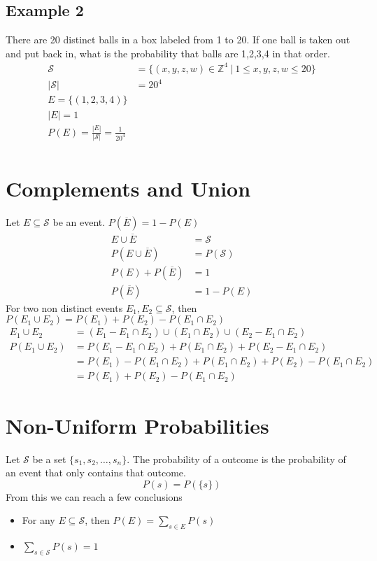 \documentclass{article}
\theoremstyle{mytheoremstyle}
\theoremstyle{mytheoremstyle}
\theoremstyle{myproblemstyle}
\begin{document}
    \subsection*{Example 2}
    There are 20 distinct balls in a box labeled from 1 to 20. If one ball is
    taken out and put back in, what is the probability that balls are 1,2,3,4 in
    that order.
    \begin{align*}
        \mathcal{S} &= \{ (x,y,z,w)\in \mathbb{Z}^4\ |\ 1\le x,y,z,w\le 20\} \\
        |\mathcal{S}| &= 20^4 \\
        E = \{(1,2,3,4)\} \\
        |E| = 1 \\
        P(E) = \frac{|E|}{|\mathcal{S}|} = \frac{1}{20^4} \\
    \end{align*}

    \section*{Complements and Union}
    Let $E\subseteq \mathcal{S}$ be an event. $P(\overline{E})=1-P(E)$
    \begin{align*}
        E \cup \overline{E} &= \mathcal{S} \\
        P(E \cup \overline{E}) &= P(\mathcal{S}) \\
        P(E) + P(\overline{E}) &= 1 \\
        P(\overline{E}) &= 1 - P(E)
    \end{align*}
    For two non distinct events $E_1,E_2\subseteq{\mathcal{S}}$, then
    $P(E_1\cup E_2)=P(E_1)+P(E_2)-P(E_1\cap E_2)$
    \begin{align*}
        E_1\cup E_2 &= (E_1 - E_1 \cap E_2) \cup (E_1 \cap E_2) \cup (E_2 - E_1\cap E_2) \\
        P(E_1\cup E_2) &= P(E_1 - E_1 \cap E_2) + P(E_1 \cap E_2) + P(E_2 - E_1\cap E_2) \\
                       &= P(E_1) - P(E_1 \cap E_2) + P(E_1 \cap E_2) + P(E_2) - P(E_1\cap E_2) \\
                       &= P(E_1) + P(E_2) - P(E_1\cap E_2)
    \end{align*}

    \section*{Non-Uniform Probabilities}
    Let $\mathcal{S}$ be a set $\{s_1,s_2,\dots,s_n\}$. The probability of a
    outcome is the probability of an event that only contains that outcome.
    \[
        P(s) = P(\{s\})
    \]
    From this we can reach a few conclusions
    \begin{itemize}
        \item For any $E\subseteq \mathcal{S}$, then $P(E) = \sum_{s\in E} P(s)$
        \item $\sum_{s\in\mathcal{S}}P(s) = 1$
    \end{itemize}
\end{document}
